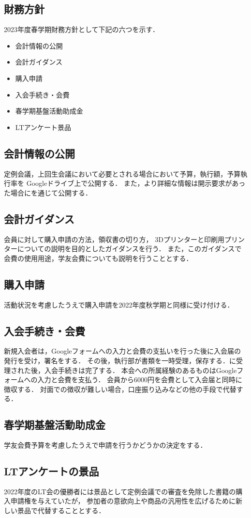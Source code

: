 \subsection*{財務方針}


2023年度春学期財務方針として下記の六つを示す．
\begin{itemize}
    \item 会計情報の公開
    \item 会計ガイダンス
    \item 購入申請
    \item 入会手続き・会費
    \item 春学期基盤活動助成金
    \item LTアンケート景品
\end{itemize}

\subsection*{会計情報の公開}
定例会議，上回生会議において必要とされる場合において予算，執行額，予算執行率を Googleドライブ上で公開する．
また，より詳細な情報は開示要求があった場合に\kaikeiStaff{}を通じて公開する．

\subsection*{会計ガイダンス}
会員に対して購入申請の方法，領収書の切り方， 3Dプリンターと印刷用プリンターについての説明を目的としたガイダンスを行う．
また，このガイダンスで会費の使用用途，学友会費についても説明を行うこととする．

\subsection*{購入申請}
活動状況を考慮したうえで購入申請を2022年度秋学期と同様に受け付ける．

\subsection*{入会手続き・会費}
新規入会者は，Googleフォームへの入力と会費の支払いを行った後に入会届の発行を受け，署名をする．
その後，執行部が書類を一時受理，保存する．\president{}に受理された後，入会手続きは完了する．
本会への所属経験のあるものはGoogleフォームへの入力と会費を支払う．
会員から6000円を会費として入会届と同時に徴収する．
対面での徴収が難しい場合，口座振り込みなどの他の手段で代替する．

\subsection*{春学期基盤活動助成金}
学友会費予算を考慮したうえで申請を行うかどうかの決定をする．

\subsection*{LTアンケートの景品}
2022年度のLT会の優勝者には景品として定例会議での審査を免除した書籍の購入申請権を与えていたが，
参加者の意欲向上や商品の汎用性を広げるために新しい景品で代替することとする．
